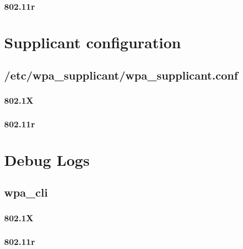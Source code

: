 \subsubsection{802.11r}



\section{Supplicant configuration}
\label{sec:Code;sub:supplicant}

\subsection{/etc/wpa\_supplicant/wpa\_supplicant.conf}
\subsubsection{802.1X}


\subsubsection{802.11r}


\section{Debug Logs}
\subsection{wpa\_cli}
\subsubsection{802.1X}


\subsubsection{802.11r}
